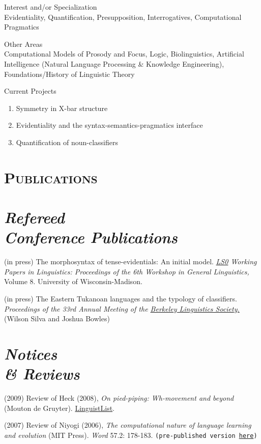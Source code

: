 \documentclass{resume}
\begin{document}
\begin{resume}
{\sc Interest and/or Specialization}\\ 
Evidentiality, Quantification, Presupposition, Interrogatives, Computational Pragmatics

{\sc Other Areas}\\
Computational Models of Prosody and Focus, Logic, Biolinguistics, Artificial Intelligence (Natural Language Processing \& Knowledge Engineering), Foundations/History of Linguistic Theory
 
{\sc Current Projects}
\begin{enumerate} 
 \item Symmetry in X-bar structure
 \item Evidentiality and the syntax-semantics-pragmatics interface
 \item Quantification of noun-classifiers
 \end{enumerate} 


\section{\textsc{Publications}}

\section{{\sl Refereed\\ Conference Publications}}
(in press) The morphosyntax of tense-evidentials: An initial model. \emph{\href{http://ling.wisc.edu/lso/wpl-main.html}{LS0} Working Papers in Linguistics: Proceedings of the 6th Workshop in General Linguistics,} Volume 8. University of Wisconsin-Madison.

(in press) The Eastern Tukanoan languages and the typology of classifiers. \emph{Proceedings of the 33rd
Annual Meeting of the \href{http://linguistics.berkeley.edu/BLS/past_meetings.html}{Berkeley Linguistics Society.}} (Wilson Silva and Joshua Bowles)


\section{{\sl Notices\\ \& Reviews}}
(2009) Review of Heck (2008), \emph{On pied-piping: Wh-movement and beyond} (Mouton de
Gruyter). \href{http://linguistlist.org/issues/20/20-2283.html}{LinguistList}.

(2007) Review of Niyogi (2006), \emph{The computational nature of language learning and evolution} (MIT Press). {\it Word} 57.2: 178-183. \texttt{(pre-published version \href{http://sites.google.com/site/bowleslinguistics/Home/research/teaching-1/publications}{here})}


\end{resume}
\end{document}
